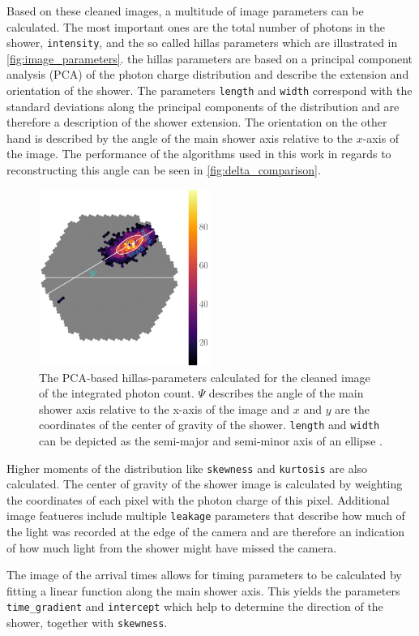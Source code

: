 Based on these cleaned images, a multitude of image parameters can be calculated.
The most important ones are the total number of photons in the shower, \texttt{intensity}, and the so called hillas parameters which are illustrated in \autoref{fig:image_parameters}.
the hillas parameters are based on a principal component analysis (PCA) of the photon charge distribution and describe the extension and orientation of the shower.
The parameters \texttt{length} and \texttt{width} correspond with the standard deviations along the principal components of the distribution and are therefore a 
description of the shower extension. 
The orientation on the other hand is described by the angle of the main shower axis relative to the $x$-axis of the image.
The performance of the algorithms used in this work in regards to reconstructing this angle can be seen in \autoref{fig:delta_comparison}.
\begin{figure}
    \centering
    \includegraphics[width=0.5\textwidth]{images/image_parameters.png}
    \caption{The PCA-based hillas-parameters calculated for the cleaned image of the integrated photon count.
        $\Psi$ describes the angle of the main shower axis relative to the x-axis of the image and $x$ and $y$ are the coordinates of the center of gravity of the shower. 
        \texttt{length} and \texttt{width} can be depicted as the semi-major and semi-minor axis of an ellipse \cite{lukas}.
    }
    \label{fig:image_parameters}
\end{figure}

Higher moments of the distribution like \texttt{skewness} and \texttt{kurtosis} are also calculated. 
The center of gravity of the shower image is calculated by weighting the coordinates of each pixel with the photon charge of this pixel.
Additional image featueres include multiple \texttt{leakage} parameters that describe how much of the light was recorded at the edge of the camera and are
therefore an indication of how much light from the shower might have missed the camera.

The image of the arrival times allows for timing parameters to be calculated by fitting a linear function along the main shower axis. 
This yields the parameters \texttt{time\_gradient} and \texttt{intercept} which help to determine the direction of the shower, together with \texttt{skewness}.